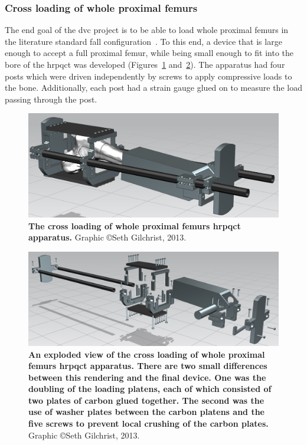 \subsubsection{Cross loading of whole proximal femurs}
\label{sec:dvc_apparatus_cross}
The end goal of the \ac{dvc} project is to be able to load whole proximal femurs in the literature standard fall configuration~\citep{gilchrist_development_2013}.
To this end, a device that is large enough to accept a full proximal femur, while being small enough to fit into the bore of the \ac{hrpqct} was developed (Figures~\ref{fig:InSannerLoader} and~\ref{fig:InSannerLoaderExplode}).
The apparatus had four posts which were driven independently by screws to apply compressive loads to the bone.
Additionally, each post had a strain gauge glued on to measure the load passing through the post.

\begin{figure}
\centering
\includegraphics[width=\linewidth]{./appendixDvc/figures/CrossLoadDwg/InSannerLoader}
\caption[Cross loading \acs*{hrpqct} apparatus]{\textbf{The cross loading of whole proximal femurs \acs*{hrpqct} apparatus.} Graphic \copyright Seth Gilchrist, 2013.}
\label{fig:InSannerLoader}
\end{figure}

\begin{figure}
\centering
\includegraphics[width=\linewidth]{./appendixDvc/figures/CrossLoadDwg/InSannerLoaderExplode}
\caption[Exploded view of the cross loading \acs*{hrpqct} apparatus]{\textbf{An exploded view of the cross loading of whole proximal femurs \acs*{hrpqct} apparatus. There are two small differences between this rendering and the final device. One was the doubling of the loading platens, each of which consisted of two plates of carbon glued together. The second was the use of washer plates between the carbon platens and the five screws to prevent local crushing of the carbon plates.} Graphic \copyright Seth Gilchrist, 2013.}
\label{fig:InSannerLoaderExplode}
\end{figure}

